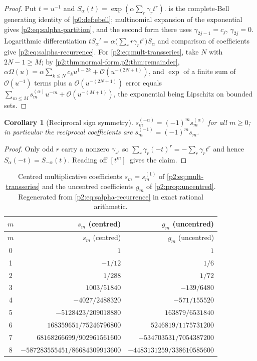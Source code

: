 \documentclass[11pt,a4paper,oneside]{book}
\theoremstyle{plain}
\newtheorem{corollary}[theorem]{Corollary}
\theoremstyle{definition}
\theoremstyle{remark}
\newcommand{\Coef}[1]{[#1]\,}
\newcommand{\bigO}{\mathcal{O}}
\begin{document}
\begin{proof}
Put \(t=u^{-1}\) and \(S_\alpha(t)=\exp(\alpha\sum_r\gamma_rt^r)\).
 is the complete-Bell generating identity of
\cref{p0:def:ebell}; multinomial expansion of the exponential gives
\cref{p2:eq:salpha-partition}, and the second form there uses
\(\gamma_{2j-1}=c_j\), \(\gamma_{2j}=0\).  Logarithmic differentiation
\(tS_\alpha'=\alpha\bigl(\sum_r r\gamma_rt^r\bigr)S_\alpha\) and comparison of
coefficients give \cref{p2:eq:salpha-recurrence}.  For
\cref{p2:eq:mult-transseries}, take \(N\) with \(2N-1\ge M\); by
\cref{p2:thm:normal-form,p2:thm:remainder},
\(\alpha\Omega(u)=\alpha\sum_{k\le N}c_ku^{1-2k}+\bigO(u^{-(2N+1)})\), and
\(\exp\) of a finite sum of \(\bigO(u^{-1})\) terms plus a
\(\bigO(u^{-(2N+1)})\) error equals \(\sum_{m\le M}s^{(\alpha)}_mu^{-m}
+\bigO(u^{-(M+1)})\), the exponential being Lipschitz on bounded sets.
\end{proof}

\begin{corollary}[Reciprocal sign symmetry]
\label{p2:cor:reciprocal-sign}
\(s^{(-\alpha)}_m=(-1)^m s^{(\alpha)}_m\) for all \(m\ge0\); in particular the
reciprocal coefficients are \(s^{(-1)}_m=(-1)^ms_m\).
\end{corollary}

\begin{proof}
Only odd \(r\) carry a nonzero \(\gamma_r\), so
\(\sum_r\gamma_r(-t)^r=-\sum_r\gamma_rt^r\) and hence
\(S_\alpha(-t)=S_{-\alpha}(t)\).  Reading off \(\Coef{t^m}\) gives the claim.
\end{proof}

\begin{center}
\small
\begin{longtable}{c r r}
\caption{Centred multiplicative coefficients \(s_m=s^{(1)}_m\) of
\cref{p2:eq:mult-transseries} and the uncentred coefficients \(g_m\) of
\cref{p2:prop:uncentred}.  Regenerated from
\cref{p2:eq:salpha-recurrence} in exact rational arithmetic.}
\label{p2:tab:sm}\\
\toprule
\(m\) & \(s_m\) (centred) & \(g_m\) (uncentred)\\
\midrule
\endfirsthead
\toprule
\(m\) & \(s_m\) (centred) & \(g_m\) (uncentred)\\
\midrule
\endhead
0 & \(1\) & \(1\)\\
1 & \(-1/12\) & \(1/6\)\\
2 & \(1/288\) & \(1/72\)\\
3 & \(1003/51840\) & \(-139/6480\)\\
4 & \(-4027/2488320\) & \(-571/155520\)\\
5 & \(-5128423/209018880\) & \(163879/6531840\)\\
6 & \(168359651/75246796800\) & \(5246819/1175731200\)\\
7 & \(68168266699/902961561600\) & \(-534703531/7054387200\)\\
8 & \(-587283555451/86684309913600\) & \(-4483131259/338610585600\)\\
\bottomrule
\end{longtable}
\end{center}
\end{document}

